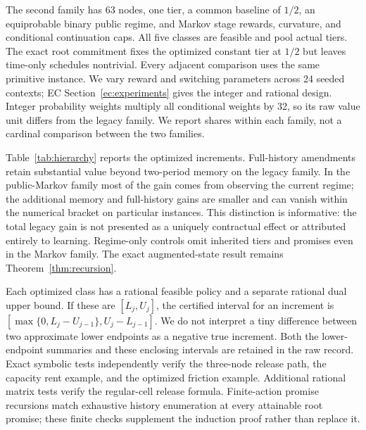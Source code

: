 \documentclass[11pt,letterpaper]{article}
\theoremstyle{definition}\newtheorem{assumption}[theorem]{Assumption}
\begin{document}
The second family has 63 nodes, one tier, a common baseline of $1/2$, an equiprobable binary public regime, and Markov stage rewards, curvature, and conditional continuation caps. All five classes are feasible and pool actual tiers. The exact root commitment fixes the optimized constant tier at $1/2$ but leaves time-only schedules nontrivial. Every adjacent comparison uses the same primitive instance. We vary reward and switching parameters across 24 seeded contexts; EC Section~\ref{ec:experiments} gives the integer and rational design. Integer probability weights multiply all conditional weights by 32, so its raw value unit differs from the legacy family. We report shares within each family, not a cardinal comparison between the two families.

Table~\ref{tab:hierarchy} reports the optimized increments. Full-history amendments retain substantial value beyond two-period memory on the legacy family. In the public-Markov family most of the gain comes from observing the current regime; the additional memory and full-history gains are smaller and can vanish within the numerical bracket on particular instances. This distinction is informative: the total legacy gain is not presented as a uniquely contractual effect or attributed entirely to learning. Regime-only controls omit inherited tiers and promises even in the Markov family. The exact augmented-state result remains Theorem~\ref{thm:recursion}.



Each optimized class has a rational feasible policy and a separate rational dual upper bound. If these are $[L_j,U_j]$, the certified interval for an increment is
$[\max\{0,L_j-U_{j-1}\},U_j-L_{j-1}]$. We do not interpret a tiny difference between two approximate lower endpoints as a negative true increment. Both the lower-endpoint summaries and these enclosing intervals are retained in the raw record. Exact symbolic tests independently verify the three-node release path, the capacity rent example, and the optimized friction example. Additional rational matrix tests verify the regular-cell release formula. Finite-action promise recursions match exhaustive history enumeration at every attainable root promise; these finite checks supplement the induction proof rather than replace it.
\end{document}
